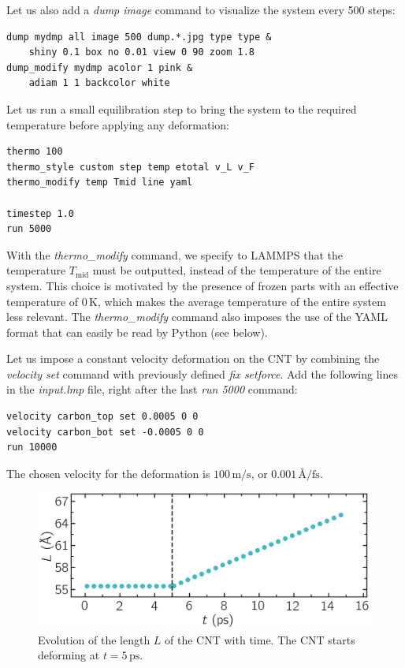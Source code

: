 \documentclass[9pt,tutorial]{livecoms}
\begin{document}
Let us also add a \textit{dump image} command to visualize the system
every 500 steps:
{\normalsize \begin{verbatim}
dump mydmp all image 500 dump.*.jpg type type &
    shiny 0.1 box no 0.01 view 0 90 zoom 1.8
dump_modify mydmp acolor 1 pink &
    adiam 1 1 backcolor white
\end{verbatim}}
Let us run a small equilibration step to bring the system to the required
temperature before applying any deformation:
{\normalsize \begin{verbatim}
thermo 100
thermo_style custom step temp etotal v_L v_F
thermo_modify temp Tmid line yaml

timestep 1.0
run 5000
\end{verbatim}}
With the \textit{thermo\_modify} command, we specify to LAMMPS that the
temperature $T_\mathrm{mid}$ must be outputted, instead of the
temperature of the entire system. This choice is motivated by the presence of
frozen parts with an effective temperature of 0\,K, which makes the average
temperature of the entire system less relevant. The \textit{thermo\_modify}
command also imposes the use of the YAML format that can easily be read by
Python (see below).

Let us impose a constant velocity deformation on the CNT
by combining the \textit{velocity set} command with previously defined
\textit{fix setforce}. Add the following lines in the \textit{input.lmp} file,
right after the last \textit{run 5000} command:
{\normalsize \begin{verbatim}
velocity carbon_top set 0.0005 0 0
velocity carbon_bot set -0.0005 0 0
run 10000
\end{verbatim}}
The chosen velocity for the deformation is $100\,\text{m/s}$, or
$0.001\,\text{\AA{}/fs}$.

\begin{figure}
\centering
\includegraphics[width=\linewidth]{CNT-lenght-unbreakable}
\caption{Evolution of the length $L$ of the CNT with time. The CNT starts
deforming at $t = 5\,\text{ps}$.}
\label{fig:CNT-unbreakable-lenght}
\end{figure}
\end{document}
